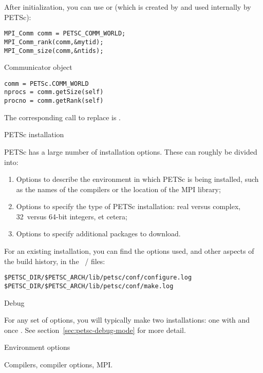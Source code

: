 After initialization, you can use  or
(which is created by  and used internally by PETSc):

\begin{lstlisting}
MPI_Comm comm = PETSC_COMM_WORLD;
MPI_Comm_rank(comm,&mytid);
MPI_Comm_size(comm,&ntids);
\end{lstlisting}

\begin{pythonnote}{Communicator object}
\begin{verbatim}
comm = PETSc.COMM_WORLD
nprocs = comm.getSize(self) 
procno = comm.getRank(self)
\end{verbatim}
\end{pythonnote}

The corresponding call to replace  is
.

 {PETSc installation}
\label{sec:petsc-install}

PETSc has a large number of installation options. These can roughly be
divided into:
\begin{enumerate}
\item Options to describe the environment in which PETSc is being
  installed, such as the names of the compilers or the location of the
  MPI library;
\item Options to specify the type of PETSc installation: real versus
  complex, 32~versus 64-bit integers, et cetera;
\item Options to specify additional packages to download.
\end{enumerate}

For an existing installation, you can find the options used,
and other aspects of the build history,
in the ~/ 
files:
\begin{verbatim}
$PETSC_DIR/$PETSC_ARCH/lib/petsc/conf/configure.log
$PETSC_DIR/$PETSC_ARCH/lib/petsc/conf/make.log
\end{verbatim}

 {Debug}

For any set of options, you will typically make two installations:
one with  and once .
See section~\ref{sec:petsc-debug-mode} for more detail.

 {Environment options}

Compilers, compiler options, MPI.

